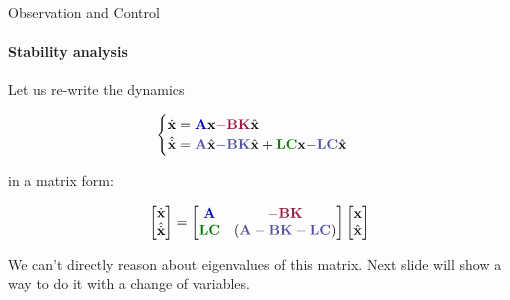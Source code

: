 \documentclass{beamer}
\begin{document}
\begin{frame}{Observation and Control}
\framesubtitle{Stability analysis}
\begin{flushleft}

Let us re-write the dynamics

\begin{equation}
\begin{cases}
\dot {\bo{x}} = \textcolor{mydarkblue}{\bo{A}} \bo{x} \textcolor{mydarkpink}{- \bo{B} \bo{K}} \hat{\bo{x}} 
\\
\hat{\dot {\bo{x}}} = \textcolor{mydarkgray}{\bo{A}} \hat{\bo{x}} \textcolor{mydarkgray}{- \bo{B} \bo{K}} \hat{\bo{x}} + \textcolor{mydarkgreen}{\bo{L}\bo{C}} \bo{x} \textcolor{mydarkgray}{- \bo{L}\bo{C}} \hat{\bo{x}}
\end{cases}
\end{equation}

in a matrix form:

\begin{equation}
\begin{bmatrix}
\dot {\bo{x}} \\
\hat{\dot {\bo{x}}}
\end{bmatrix}
=
\begin{bmatrix}
\textcolor{mydarkblue}{\bo{A}} & \textcolor{mydarkpink}{-\bo{B}\bo{K}}\\
\textcolor{mydarkgreen}{\bo{L}\bo{C}} & (\textcolor{mydarkgray}{\bo{A} - \bo{B}\bo{K}-\bo{L}\bo{C}})
\end{bmatrix}
\begin{bmatrix}
\bo{x} \\
\hat{\bo{x}}
\end{bmatrix}
\end{equation}

\bigskip

We can't directly reason about eigenvalues of this matrix. Next slide will show a way to do it with a change of variables.

\end{flushleft}
\end{frame}
\end{document}
